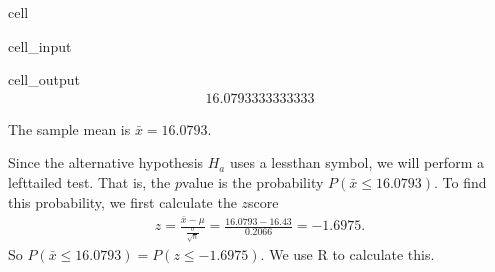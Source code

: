 \documentclass[letterpaper,10pt,english]{jupyterBook}
\begin{document}
\begin{sphinxuseclass}{cell}\begin{sphinxVerbatimInput}

\begin{sphinxuseclass}{cell_input}
\begin{sphinxVerbatim}[commandchars=\\\{\}]

\end{sphinxVerbatim}

\end{sphinxuseclass}\end{sphinxVerbatimInput}
\begin{sphinxVerbatimOutput}

\begin{sphinxuseclass}{cell_output}\begin{equation*}
\begin{split}16.0793333333333\end{split}
\end{equation*}
\end{sphinxuseclass}\end{sphinxVerbatimOutput}

\end{sphinxuseclass}
\sphinxAtStartPar
The sample mean is \(\bar{x} = 16.0793\).

\sphinxAtStartPar
Since the alternative hypothesis \(H_a\) uses a less\sphinxhyphen{}than symbol, we will perform a left\sphinxhyphen{}tailed test. That is, the \(p\)\sphinxhyphen{}value is the probability \(P(\bar{x} \leq 16.0793)\). To find this probability, we first calculate the \(z\)\sphinxhyphen{}score
\begin{equation*}
\begin{split} z = \frac{\bar{x} - \mu}{\frac{\sigma}{\sqrt{n}}} = \frac{16.0793 - 16.43}{0.2066} = -1.6975. \end{split}
\end{equation*}
\sphinxAtStartPar
So \(P(\bar{x} \leq 16.0793) = P(z \leq -1.6975)\). We use R to calculate this.
\end{document}
